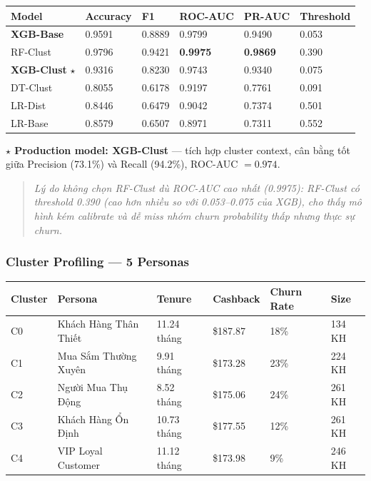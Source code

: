 \documentclass[12pt,a4paper]{article}
\begin{document}
\begin{center}
\begin{tabular}{llllll}
  \toprule
  \textbf{Model} & \textbf{Accuracy} & \textbf{F1} & \textbf{ROC-AUC} & \textbf{PR-AUC} & \textbf{Threshold} \\
  \midrule
  \textbf{XGB-Base}     & 0.9591          & 0.8889          & 0.9799          & 0.9490          & 0.053 \\
  RF-Clust              & 0.9796          & 0.9421          & \textbf{0.9975} & \textbf{0.9869} & 0.390 \\
  \textbf{XGB-Clust} $\star$ & 0.9316 & 0.8230     & 0.9743          & 0.9340          & 0.075 \\
  DT-Clust              & 0.8055          & 0.6178          & 0.9197          & 0.7761          & 0.091 \\
  LR-Dist               & 0.8446          & 0.6479          & 0.9042          & 0.7374          & 0.501 \\
  LR-Base               & 0.8579          & 0.6507          & 0.8971          & 0.7311          & 0.552 \\
  \bottomrule
\end{tabular}
\end{center}

\textbf{$\star$ Production model: XGB-Clust} --- tích hợp cluster context, cân bằng tốt giữa
Precision (73.1\%) và Recall (94.2\%), ROC-AUC $= 0.974$.

\begin{quote}
  \textit{Lý do không chọn RF-Clust dù ROC-AUC cao nhất (0.9975): RF-Clust có threshold 0.390
  (cao hơn nhiều so với 0.053--0.075 của XGB), cho thấy mô hình kém calibrate và dễ miss nhóm
  churn probability thấp nhưng thực sự churn.}
\end{quote}

\subsubsection{Cluster Profiling --- 5 Personas}
\label{sec:cluster-ecom}

\begin{center}
\begin{tabular}{llllll}
  \toprule
  \textbf{Cluster} & \textbf{Persona} & \textbf{Tenure} & \textbf{Cashback} & \textbf{Churn Rate} & \textbf{Size} \\
  \midrule
  C0 & Khách Hàng Thân Thiết & 11.24 tháng & \$187.87 & 18\% & 134 KH \\
  C1 & Mua Sắm Thường Xuyên   & 9.91 tháng  & \$173.28 & 23\% & 224 KH \\
  C2 & Người Mua Thụ Động     & 8.52 tháng  & \$175.06 & 24\% & 261 KH \\
  C3 & Khách Hàng Ổn Định     & 10.73 tháng & \$177.55 & 12\% & 261 KH \\
  C4 & VIP Loyal Customer     & 11.12 tháng & \$173.98 & 9\%  & 246 KH \\
  \bottomrule
\end{tabular}
\end{center}
\end{document}
